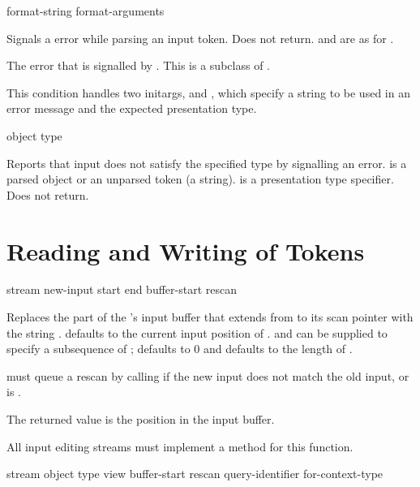  {format-string \rest format-arguments}

Signals a  error while parsing an input token.  Does not
return.   and  are as for .


The error that is signalled by .  This is a
subclass of .

This condition handles two initargs,  and , which specify
a string to be used in an error message and the expected presentation type.

 {object type}

Reports that input does not satisfy the specified type by signalling an
 error.   is a parsed object or an
unparsed token (a string).   is a presentation type specifier.  Does
not return.
 

\section {Reading and Writing of Tokens}

 {stream new-input 
                             \key start end buffer-start rescan}

Replaces the part of the  's input buffer
that extends from  to its scan pointer with the string
.   defaults to the current input position of
.   and  can be supplied to specify a
subsequence of ;  defaults to 0 and  defaults
to the length of .

 must queue a rescan by calling  if the new
input does not match the old input, or  is .

The returned value is the position in the input buffer.

All input editing streams must implement a method for this function.

 {stream object type view
                                          \key buffer-start rescan 
                                               query-identifier for-context-type}

